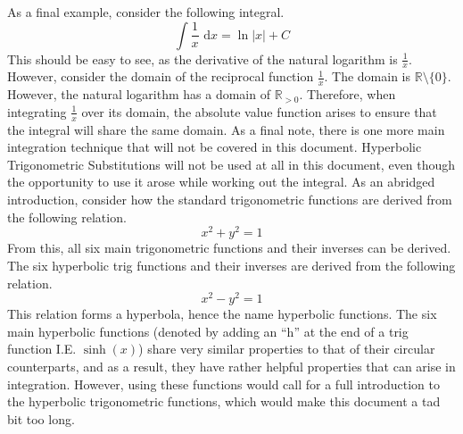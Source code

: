 \documentclass[oneside]{book}
\newcommand\tab[1][1cm]{\hspace*{#1}}
\newcommand\nextline{\newline\tab}
\renewcommand\d[1]{\text{ d}#1}
\newcommand{\abs}[1]{\left\lvert#1\right\rvert}
\begin{document}
\nextline
As a final example, consider the following integral.
\begin{equation*}
\int \frac{1}{x}\d{x} = \ln\abs{x} + C
\end{equation*}
\tab
This should be easy to see, as the derivative of the natural logarithm is $\frac{1}{x}$. However, consider the domain of the reciprocal function $\frac{1}{x}$. The domain is $\mathbb{R}\setminus\{0\}$. However, the natural logarithm has a domain of $\mathbb{R}_{>0}$. Therefore, when integrating $\frac{1}{x}$ over its domain, the absolute value function arises to ensure that the integral will share the same domain.
\nextline
As a final note, there is one more main integration technique that will not be covered in this document. Hyperbolic Trigonometric Substitutions will not be used at all in this document, even though the opportunity to use it arose while working out the integral.
\nextline
As an abridged introduction, consider how the standard trigonometric functions are derived from the following relation.
\begin{equation*}
x^2+y^2=1
\end{equation*}
\tab
From this, all six main trigonometric functions and their inverses can be derived. The six hyperbolic trig functions and their inverses are derived from the following relation.
\begin{equation*}
x^2-y^2=1
\end{equation*}
\tab
This relation forms a hyperbola, hence the name hyperbolic functions. The six main hyperbolic functions (denoted by adding an ``h'' at the end of a trig function I.E. $\sinh(x)$) share very similar properties to that of their circular counterparts, and as a result, they have rather helpful properties that can arise in integration. However, using these functions would call for a full introduction to the hyperbolic trigonometric functions, which would make this document a tad bit too long.
\end{document}
